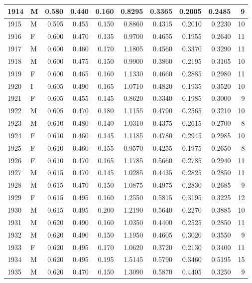 \documentclass[9pt,twocolumn,twoside,]{pnas-new}
\begin{document}
\begin{tabular}{l|l|r|r|r|r|r|r|r|r}
\hline
1914 & M & 0.580 & 0.440 & 0.160 & 0.8295 & 0.3365 & 0.2005 & 0.2485 & 9\\
\hline
1915 & M & 0.595 & 0.455 & 0.150 & 0.8860 & 0.4315 & 0.2010 & 0.2230 & 10\\
\hline
1916 & F & 0.600 & 0.470 & 0.135 & 0.9700 & 0.4655 & 0.1955 & 0.2640 & 11\\
\hline
1917 & M & 0.600 & 0.460 & 0.170 & 1.1805 & 0.4560 & 0.3370 & 0.3290 & 11\\
\hline
1918 & M & 0.600 & 0.475 & 0.150 & 0.9900 & 0.3860 & 0.2195 & 0.3105 & 10\\
\hline
1919 & F & 0.600 & 0.465 & 0.160 & 1.1330 & 0.4660 & 0.2885 & 0.2980 & 11\\
\hline
1920 & I & 0.605 & 0.490 & 0.165 & 1.0710 & 0.4820 & 0.1935 & 0.3520 & 10\\
\hline
1921 & F & 0.605 & 0.455 & 0.145 & 0.8620 & 0.3340 & 0.1985 & 0.3000 & 9\\
\hline
1922 & M & 0.605 & 0.470 & 0.180 & 1.1155 & 0.4790 & 0.2565 & 0.3210 & 10\\
\hline
1923 & M & 0.610 & 0.480 & 0.140 & 1.0310 & 0.4375 & 0.2615 & 0.2700 & 8\\
\hline
1924 & F & 0.610 & 0.460 & 0.145 & 1.1185 & 0.4780 & 0.2945 & 0.2985 & 10\\
\hline
1925 & F & 0.610 & 0.460 & 0.155 & 0.9570 & 0.4255 & 0.1975 & 0.2650 & 8\\
\hline
1926 & F & 0.610 & 0.470 & 0.165 & 1.1785 & 0.5660 & 0.2785 & 0.2940 & 11\\
\hline
1927 & M & 0.615 & 0.470 & 0.145 & 1.0285 & 0.4435 & 0.2825 & 0.2850 & 11\\
\hline
1928 & M & 0.615 & 0.470 & 0.150 & 1.0875 & 0.4975 & 0.2830 & 0.2685 & 9\\
\hline
1929 & F & 0.615 & 0.495 & 0.160 & 1.2550 & 0.5815 & 0.3195 & 0.3225 & 12\\
\hline
1930 & M & 0.615 & 0.495 & 0.200 & 1.2190 & 0.5640 & 0.2270 & 0.3885 & 10\\
\hline
1931 & M & 0.620 & 0.490 & 0.160 & 1.0350 & 0.4400 & 0.2525 & 0.2850 & 11\\
\hline
1932 & M & 0.620 & 0.490 & 0.150 & 1.1950 & 0.4605 & 0.3020 & 0.3550 & 9\\
\hline
1933 & F & 0.620 & 0.495 & 0.170 & 1.0620 & 0.3720 & 0.2130 & 0.3400 & 11\\
\hline
1934 & M & 0.620 & 0.495 & 0.195 & 1.5145 & 0.5790 & 0.3460 & 0.5195 & 15\\
\hline
1935 & M & 0.620 & 0.470 & 0.150 & 1.3090 & 0.5870 & 0.4405 & 0.3250 & 9\\

\end{tabular}
\end{document}
